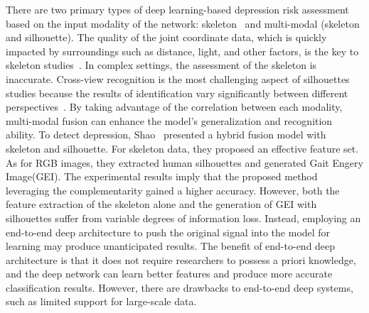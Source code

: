 \documentclass[10pt,twocolumn,letterpaper]{article}
\begin{document}
There are two primary types of deep learning-based depression risk assessment based on the input modality of the network: skeleton~\cite{yang2022data} and multi-modal (skeleton and silhouette).
The quality of the joint coordinate data, which is quickly impacted by surroundings such as distance, light, and other factors, is the key to skeleton studies~\cite{cippitelli2016human}.
In complex settings, the assessment of the skeleton is inaccurate.
Cross-view recognition is the most challenging aspect of silhouettes studies because the results of identification vary significantly between different perspectives~\cite{wu2016comprehensive}.
By taking advantage of the correlation between each modality, multi-modal fusion can enhance the model's generalization and recognition ability.
To detect depression, Shao~\cite{shao2021multi} presented a hybrid fusion model with skeleton and silhouette.
For skeleton data, they proposed an effective feature set. As for RGB images, they extracted human silhouettes
and generated Gait Engery Image(GEI).
The experimental results imply that the proposed method leveraging the complementarity gained a higher accuracy.
However, both the feature extraction of the skeleton alone and the generation of GEI with  silhouettes suffer from variable degrees of information loss.
Instead, employing an end-to-end deep architecture to push the original signal into the model for learning may produce unanticipated results.
The benefit of end-to-end deep architecture is that it does not require researchers to possess a priori knowledge, and the deep network can learn better features and produce more accurate classification results.
However, there are drawbacks to end-to-end deep systems, such as limited support for large-scale data.




{\small


}
\end{document}
